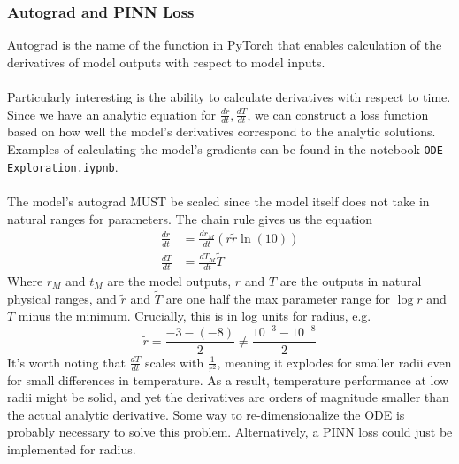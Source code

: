 \documentclass{article}
\begin{document}
\subsubsection{Autograd and PINN Loss}
Autograd is the name of the function in PyTorch that enables calculation of the derivatives of model outputs with respect to model inputs.\\\\
Particularly interesting is the ability to calculate derivatives with respect to time. Since we have an analytic equation for $\frac{dr}{dt}, \frac{dT}{dt}$, we can construct a loss function based on how well the model's derivatives correspond to the analytic solutions. Examples of calculating the model's gradients can be found in the notebook \lstinline{ODE Exploration.iypnb}.\\\\
The model's autograd MUST be scaled since the model itself does not take in natural ranges for parameters. The chain rule gives us the equation
\begin{align*}
	\frac{dr}{dt} &= \frac{dr_M}{dt}\left(r\tilde r\ln(10)\right)\\
	\frac{dT}{dt} &= \frac{dT_M}{dt}\tilde T
\end{align*}
Where $r_M$ and $t_M$ are the model outputs, $r$ and $T$ are the outputs in natural physical ranges, and $\tilde r$ and $\tilde T$ are one half the max parameter range for $\log r$ and $T$ minus the minimum. Crucially, this is in log units for radius, e.g.
\[
	\tilde r = \frac{-3 - (-8)}{2} \neq \frac{10^{-3} - 10^{-8}}{2}
\]
It's worth noting that $\frac{dT}{dt}$ scales with $\frac{1}{r^2}$, meaning it explodes for smaller radii even for small differences in temperature. As a result, temperature performance at low radii might be solid, and yet the derivatives are orders of magnitude smaller than the actual analytic derivative. Some way to re-dimensionalize the ODE is probably necessary to solve this problem. Alternatively, a PINN loss could just be implemented for radius.
\end{document}
